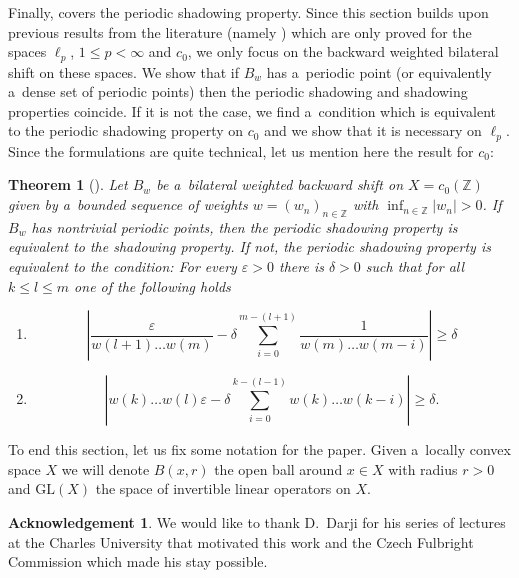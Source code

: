 \documentclass[11pt,a4paper]{amsart}
\newtheorem*{theorem*}{Theorem}
\theoremstyle{definition}
\newtheorem*{acknowledgement}{Acknowledgement}
\newcommand{\Z}{\mathbb{Z}}
\newcommand{\eps}{\varepsilon}
\newcommand{\abs}[1]{\left| #1 \right|}
\newcommand{\GL}{\mathrm{GL}}
\begin{document}
	Finally,  covers the periodic shadowing property. Since this section builds upon previous results from the literature (namely \cite{Shadowing_structural_stability, Shadowing_and_chain_rec}) which are only proved for the spaces $\ell_p$, $1 \leq p < \infty$ and $c_0$, we only focus on the backward weighted bilateral shift on these spaces. We show that if $B_w$ has a~periodic point (or equivalently a~dense set of periodic points) then the periodic shadowing and shadowing properties coincide. If it is not the case, we find a~condition which is equivalent to the periodic shadowing property on $c_0$ and we show that it is necessary on $\ell_p$. Since the formulations are quite technical, let us mention here the result for $c_0$:
	\begin{theorem*}[{}]
		Let $B_w$ be a~bilateral weighted backward shift on \(X = c_0(\Z)\) given by a~bounded sequence of weights \(w = (w_n)_{n \in \Z}\) with \(\inf_{n \in \Z}\abs{w_n} > 0\). If $B_w$ has nontrivial periodic points, then the periodic shadowing property is equivalent to the shadowing property. If not, the periodic shadowing property is equivalent to the condition:
		For every $\eps > 0$ there is $\delta > 0$ such that for all $k \leq l \leq m$ one of the following holds
		\begin{enumerate}
			\item[(a)] \begin{equation*}
				\abs{\frac{\varepsilon}{w(l+1)\dots w(m)}- \delta \sum_{i=0}^{m-(l+1)}\frac{1}{w(m) \dots w(m-i)}} \geq \delta
			\end{equation*}
			\item[(b)] \begin{equation*}
				\abs{w(k) \dots w(l)\varepsilon -\delta\sum_{i=0}^{k-(l-1)}w(k) \dots w(k-i)} \geq \delta.
			\end{equation*}
		\end{enumerate}
	\end{theorem*}
	
	To end this section, let us fix some notation for the paper. Given a~locally convex space \(X\) we will denote $B(x, r)$ the open ball around $x \in X$ with radius $r > 0$ and $\GL(X)$ the space of invertible linear operators on $X$.
	
	\begin{acknowledgement}
		We would like to thank D.~Darji for his series of lectures at the Charles University that motivated this work and the Czech Fulbright Commission which made his stay possible.
	\end{acknowledgement}
	
\end{document}
